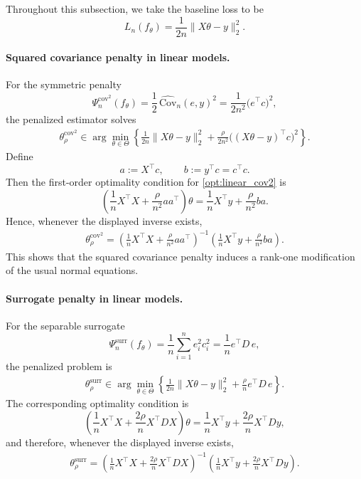 \documentclass[12pt, draft]{article}
\theoremstyle{plain}
\theoremstyle{definition}
\newcommand{\1}{\mathbf{1}}
\newcommand{\Cov}{\text{Cov}}
\begin{document}
{Throughout this subsection, we take the baseline loss to be
\[
L_n(f_\theta) = \frac{1}{2n}\|X\theta-y\|_2^2.
\]

\paragraph{Squared covariance penalty in linear models.}
For the symmetric penalty
\[
\Psi_n^{\mathrm{cov}^2}(f_\theta)
=
\frac{1}{2}\,\widehat{\Cov}_n(e,y)^2
=
\frac{1}{2n^2}\bigl(e^\top c\bigr)^2,
\]
the penalized estimator solves
\begin{align}
    \label{opt:linear_cov2}
    \theta_{\rho}^{\mathrm{cov}^2}
    \in
    \arg\min_{\theta\in\Theta}
    \left\{
        \frac{1}{2n}\|X\theta-y\|_2^2
        +
        \frac{\rho}{2n^2}\bigl((X\theta-y)^\top c\bigr)^2
    \right\}.
\end{align}
Define
\[
a := X^\top c,
\qquad
b := y^\top c = c^\top c.
\]
Then the first-order optimality condition for \eqref{opt:linear_cov2} is
\[
\left(
\frac{1}{n}X^\top X + \frac{\rho}{n^2}aa^\top
\right)\theta
=
\frac{1}{n}X^\top y + \frac{\rho}{n^2}ba.
\]
Hence, whenever the displayed inverse exists,
\begin{align}
    \label{eq:linear_cov2_closed_form}
    \theta_{\rho}^{\mathrm{cov}^2}
    =
    \left(
        \frac{1}{n}X^\top X
        +
        \frac{\rho}{n^2}aa^\top
    \right)^{-1}
    \left(
        \frac{1}{n}X^\top y
        +
        \frac{\rho}{n^2}ba
    \right).
\end{align}
This shows that the squared covariance penalty induces a rank-one modification of the usual normal equations.

\paragraph{Surrogate penalty in linear models.}
For the separable surrogate
\[
\Psi_n^{\mathrm{surr}}(f_\theta)
=
\frac{1}{n}\sum_{i=1}^n e_i^2 c_i^2
=
\frac{1}{n}e^\top D\,e,
\]
the penalized problem is
\begin{align}
    \label{opt:linear_surr}
    \theta_{\rho}^{\mathrm{surr}}
    \in
    \arg\min_{\theta\in\Theta}
    \left\{
        \frac{1}{2n}\|X\theta-y\|_2^2
        +
        \frac{\rho}{n}e^\top D\,e
    \right\}.
\end{align}
The corresponding optimality condition is
\[
\left(
\frac{1}{n}X^\top X
+
\frac{2\rho}{n}X^\top D X
\right)\theta
=
\frac{1}{n}X^\top y
+
\frac{2\rho}{n}X^\top D y,
\]
and therefore, whenever the displayed inverse exists,
\begin{align}
    \label{eq:linear_surr_closed_form}
    \theta_{\rho}^{\mathrm{surr}}
    =
    \left(
        \frac{1}{n}X^\top X
        +
        \frac{2\rho}{n}X^\top D X
    \right)^{-1}
    \left(
        \frac{1}{n}X^\top y
        +
        \frac{2\rho}{n}X^\top D y
    \right).
\end{align}

}
\end{document}
